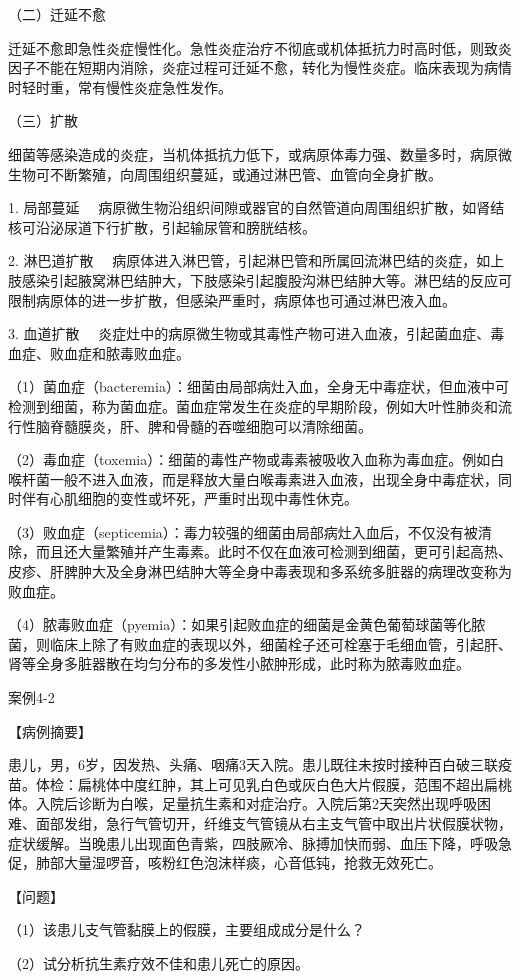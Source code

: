{（二）迁延不愈}

迁延不愈即急性炎症慢性化。急性炎症治疗不彻底或机体抵抗力时高时低，则致炎因子不能在短期内消除，炎症过程可迁延不愈，转化为慢性炎症。临床表现为病情时轻时重，常有慢性炎症急性发作。

{（三）扩散}

细菌等感染造成的炎症，当机体抵抗力低下，或病原体毒力强、数量多时，病原微生物可不断繁殖，向周围组织蔓延，或通过淋巴管、血管向全身扩散。

{1. 局部蔓延}
　病原微生物沿组织间隙或器官的自然管道向周围组织扩散，如肾结核可沿泌尿道下行扩散，引起输尿管和膀胱结核。

{2. 淋巴道扩散}
　病原体进入淋巴管，引起淋巴管和所属回流淋巴结的炎症，如上肢感染引起腋窝淋巴结肿大，下肢感染引起腹股沟淋巴结肿大等。淋巴结的反应可限制病原体的进一步扩散，但感染严重时，病原体也可通过淋巴液入血。

{3. 血道扩散}
　炎症灶中的病原微生物或其毒性产物可进入血液，引起菌血症、毒血症、败血症和脓毒败血症。

（1）菌血症（bacteremia）：细菌由局部病灶入血，全身无中毒症状，但血液中可检测到细菌，称为菌血症。菌血症常发生在炎症的早期阶段，例如大叶性肺炎和流行性脑脊髓膜炎，肝、脾和骨髓的吞噬细胞可以清除细菌。

（2）毒血症（toxemia）：细菌的毒性产物或毒素被吸收入血称为毒血症。例如白喉杆菌一般不进入血液，而是释放大量白喉毒素进入血液，出现全身中毒症状，同时伴有心肌细胞的变性或坏死，严重时出现中毒性休克。

（3）败血症（septicemia）：毒力较强的细菌由局部病灶入血后，不仅没有被清除，而且还大量繁殖并产生毒素。此时不仅在血液可检测到细菌，更可引起高热、皮疹、肝脾肿大及全身淋巴结肿大等全身中毒表现和多系统多脏器的病理改变称为败血症。

（4）脓毒败血症（pyemia）：如果引起败血症的细菌是金黄色葡萄球菌等化脓菌，则临床上除了有败血症的表现以外，细菌栓子还可栓塞于毛细血管，引起肝、肾等全身多脏器散在均匀分布的多发性小脓肿形成，此时称为脓毒败血症。

\begin{framed}
{案例4-2}

{【病例摘要】}

患儿，男，6岁，因发热、头痛、咽痛3天入院。患儿既往未按时接种百白破三联疫苗。体检：扁桃体中度红肿，其上可见乳白色或灰白色大片假膜，范围不超出扁桃体。入院后诊断为白喉，足量抗生素和对症治疗。入院后第2天突然出现呼吸困难、面部发绀，急行气管切开，纤维支气管镜从右主支气管中取出片状假膜状物，症状缓解。当晚患儿出现面色青紫，四肢厥冷、脉搏加快而弱、血压下降，呼吸急促，肺部大量湿啰音，咳粉红色泡沫样痰，心音低钝，抢救无效死亡。

{【问题】}

（1）该患儿支气管黏膜上的假膜，主要组成成分是什么？

（2）试分析抗生素疗效不佳和患儿死亡的原因。
\end{framed}

